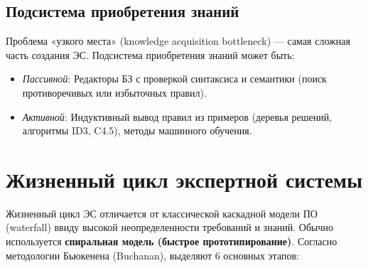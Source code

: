 \documentclass[12pt,a4paper]{article}
\begin{document}
\subsection{Подсистема приобретения знаний}
Проблема «узкого места» (knowledge acquisition bottleneck) --- самая сложная часть создания ЭС. Подсистема приобретения знаний может быть:
\begin{itemize}
    \item \textit{Пассивной}: Редакторы БЗ с проверкой синтаксиса и семантики (поиск противоречивых или избыточных правил).
    \item \textit{Активной}: Индуктивный вывод правил из примеров (деревья решений, алгоритмы ID3, C4.5), методы машинного обучения.
\end{itemize}

\section{Жизненный цикл экспертной системы}

Жизненный цикл ЭС отличается от классической каскадной модели ПО (waterfall) ввиду высокой неопределенности требований и знаний. Обычно используется \textbf{спиральная модель (быстрое прототипирование)}. Согласно методологии Бьюкенена (Buchanan), выделяют 6 основных этапов:
\end{document}
